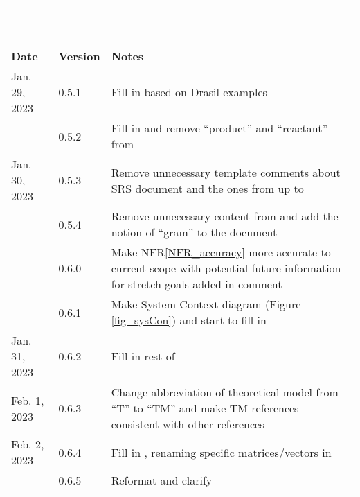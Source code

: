 \documentclass[12pt]{article}
\newcommand{\nfrref}[1]{NFR\ref{#1}}
\begin{document}
\begin{tabularx}{\textwidth}{p{2.5cm}p{1.5cm}X}
  \bottomrule~                                                                                               \\
  ~                                                                                                          \\
  \toprule {\bf Date} & {\bf Version} & {\bf Notes}                                                          \\
  \midrule
  Jan. 29, 2023       & 0.5.1         & Fill in \nameref{sec_intro} based on Drasil examples                 \\
                      & 0.5.2         & Fill in \nameref{sec_phySystDesc} and remove ``product'' and
  ``reactant'' from \nameref{sec_termsDefs}                                                                  \\
  Jan. 30, 2023       & 0.5.3         & Remove unnecessary template comments about SRS document
  and the ones from \nameref{sec_specSysDesc} up to \nameref{sec_instance}                                   \\
                      & 0.5.4         & Remove unnecessary content from \nameref{sec_tabSymbs} and
  add the notion of ``gram'' to the document                                                                 \\
                      & 0.6.0         & Make \nfrref{NFR_accuracy} more accurate to current scope with
  potential future information for stretch goals added in comment                                            \\
                      & 0.6.1         & Make System Context diagram (Figure \ref{fig_sysCon}) and start
  to fill in \nameref{sec_sysCon}                                                                            \\
  Jan. 31, 2023       & 0.6.2         & Fill in rest of \nameref{sec_genSysDesc}                             \\
  Feb. 1, 2023        & 0.6.3         & Change abbreviation of theoretical model from ``T'' to
  ``TM'' and make TM references consistent with other references                                             \\
  Feb. 2, 2023        & 0.6.4         & Fill in \nameref{sec_refMat}, renaming specific matrices/vectors
  in \nameref{sec_instance}                                                                                  \\
                      & 0.6.5         & Reformat and clarify \nameref{sec_LCs}                               \\

\end{tabularx}
\end{document}

